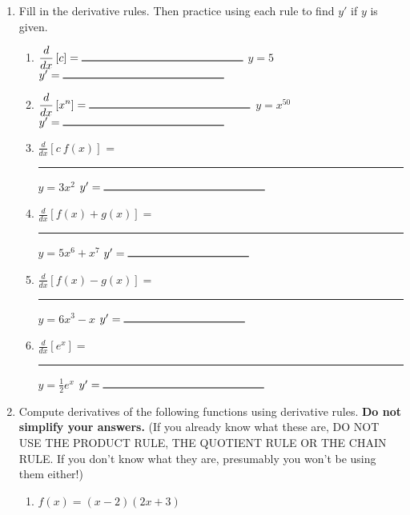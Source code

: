 \documentclass[11pt,fleqn]{article}
\begin{document}
\setlength{\parindent}{0cm}
\renewcommand{\headrulewidth}{0pt}
\newcommand{\blank}[1]{\rule{#1}{0.75pt}}
\renewcommand{\d}{\displaystyle}
\vspace*{-0.7in}
\begin{center}
 {\large{ }}
\end{center}



\begin{enumerate}

\item Fill in the derivative rules. Then practice using each rule to find $y'$ if $y$ is given.\\
	\begin{enumerate}
	\item 
	$\d{\frac{d}{dx}\left[ c\right]} = \blank{2in}$ 
	  \hspace{1cm} $y = 5$ \hspace{1cm} $y' = \blank{2in}$
	\vfill
	\item $\d{\frac{d}{dx}\left[ x^n\right]} = \blank{2in}$ 
	  \hspace{1cm}
	 $y = x^{50}$ \hspace{1cm} $y' = \blank{2in}$
	\vfill
	\item $\d{\frac{d}{dx}\left[c \: f(x) \right]}$ = \blank{2in} 
	  \hspace{1cm}
  $y = 3x^{2}$ \hspace{1cm} $y' = \blank{2in}$
	\vfill
	
	\item $\d{\frac{d}{dx}\left[ f(x)+g(x)\right]}=$\blank{1.5in}
	  \hspace{1cm}
  $y = 5x^{6} + x^{7}$ \hspace{1cm} $y' = \blank{1.5in}$
	\vfill
	\item $\d{\frac{d}{dx}\left[ f(x)-g(x)\right]}=$ \blank{1.5in}
	  \hspace{1cm}
$y = 6x^{3} - x$ \hspace{1cm} $y' = \blank{1.5in}$
	\vfill
	\item $\d{\frac{d}{dx}\left[ e^x\right]}=$ \blank{2in}
	  \hspace{1cm} $y = \frac{1}{2} e^{x}$ \hspace{1cm} $y' = \blank{2in}$
	\vfill
	\end{enumerate}

\item Compute derivatives of the following functions using derivative rules. {\bf Do not simplify your answers.} (If you already know what these are, DO NOT USE THE PRODUCT RULE, THE QUOTIENT RULE OR THE CHAIN RULE. If you don't know what they are, presumably you won't be using them either!)\\
\begin{enumerate}
\item $\d{ f(x)=(x-2)(2x+3)}$
\vfill


\end{enumerate}
\end{enumerate}
\end{document}
